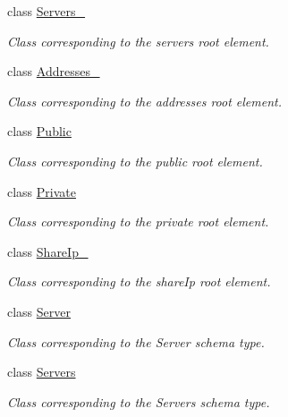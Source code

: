 \begin{DoxyCompactItemize}
class \hyperlink{classopenstack_1_1xml_1_1Servers__}{Servers\_\-}
\begin{DoxyCompactList}\small\item\em Class corresponding to the servers root element. \item\end{DoxyCompactList}\item 
class \hyperlink{classopenstack_1_1xml_1_1Addresses__}{Addresses\_\-}
\begin{DoxyCompactList}\small\item\em Class corresponding to the addresses root element. \item\end{DoxyCompactList}\item 
class \hyperlink{classopenstack_1_1xml_1_1Public}{Public}
\begin{DoxyCompactList}\small\item\em Class corresponding to the public root element. \item\end{DoxyCompactList}\item 
class \hyperlink{classopenstack_1_1xml_1_1Private}{Private}
\begin{DoxyCompactList}\small\item\em Class corresponding to the private root element. \item\end{DoxyCompactList}\item 
class \hyperlink{classopenstack_1_1xml_1_1ShareIp__}{ShareIp\_\-}
\begin{DoxyCompactList}\small\item\em Class corresponding to the shareIp root element. \item\end{DoxyCompactList}\item 
class \hyperlink{classopenstack_1_1xml_1_1Server}{Server}
\begin{DoxyCompactList}\small\item\em Class corresponding to the Server schema type. \item\end{DoxyCompactList}\item 
class \hyperlink{classopenstack_1_1xml_1_1Servers}{Servers}
\begin{DoxyCompactList}\small\item\em Class corresponding to the Servers schema type. \item\end{DoxyCompactList}\item 

\end{DoxyCompactItemize}
